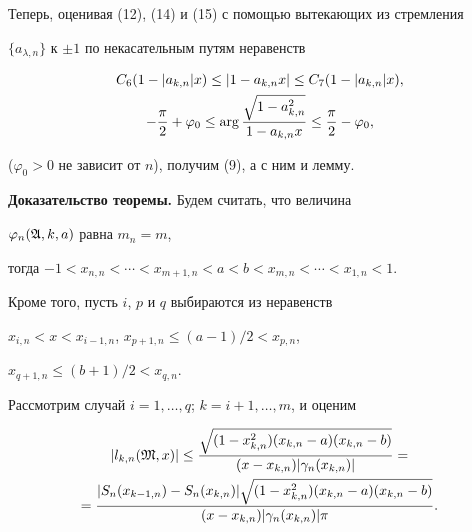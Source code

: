 \begin{pf}
Теперь, оценивая (12), (14) и (15) с помощью вытекающих из стремления


$\{a_{\lambda,n}\}$ к $\pm 1$ по некасательным путям неравенств


\cite{8}


\begin{gather}


C_6(1-|a_{k,n}|x)\le|1-a_{k,n}x|\le C_7(1-|a_{k,n}|x),\\


-\frac{\pi}{2}+\varphi_0\le\arg


\frac{\sqrt{1-a^2_{k,n}}}{1-a_{k,n}x}\le\frac{\pi}{2}-


\varphi_0,\notag


\end{gather}


($\varphi_0>0$ не зависит от $n$), получим (9), а с ним и лемму.


\end{pf}





{\bf Доказательство теоремы.} Будем считать, что величина


$\varphi_n(\frak A,k,a)$ равна $m_n=m$,


тогда $-1<x_{n,n}<\dotsb<x_{m+1,n}<a<b<x_{m,n}<\dotsb<x_{1,n}<1$.


Кроме того, пусть $i$, $p$ и $q$ выбираются из неравенств


$x_{i,n}<x<x_{i-1,n}$, $x_{p+1,n}\le(a-1)/2<x_{p,n}$,


$x_{q+1,n}\le(b+1)/2<x_{q,n}$.





Рассмотрим случай $i=1,\dotsc,q$; $k=i+1,\dotsc,m$, и оценим


\begin{multline}


|l_{k,n}(\frak M,x)|\le


\frac{\sqrt{(1-x^2_{k,n})(x_{k,n}-a)(x_{k,n}-b)}}


{(x-x_{k,n})|\gamma_n(x_{k,n})|}=\\


%


=\frac{|S_n(x_{k-1,n})-S_n(x_{k,n})|


\sqrt{(1-x^2_{k,n})(x_{k,n}-a)(x_{k,n}-b)}}


{(x-x_{k,n})|\gamma_n(x_{k,n})|\pi}.


\end{multline}


